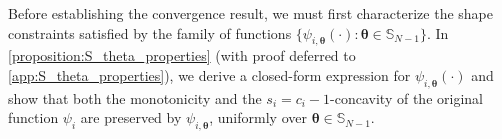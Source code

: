 \documentclass{article} %
\newtheorem{remark}[theorem]{Remark}
\begin{document}

Before establishing the convergence result, we must first characterize the shape constraints satisfied by the family of functions $\{\psi_{i,\boldsymbol{\theta}}(\cdot) : \boldsymbol{\theta} \in \mathbb{S}_{N-1}\}$. In \cref{proposition:S_theta_properties} (with proof deferred to \cref{app:S_theta_properties}), we derive a closed-form expression for $\psi_{i,\boldsymbol{\theta}}(\cdot)$ and show that both the monotonicity and the $s_i = c_i - 1$-concavity of the original function $\psi_i$ are preserved by $\psi_{i,\boldsymbol{\theta}}$, uniformly over $\boldsymbol{\theta} \in \mathbb{S}_{N-1}$.
\end{document}

